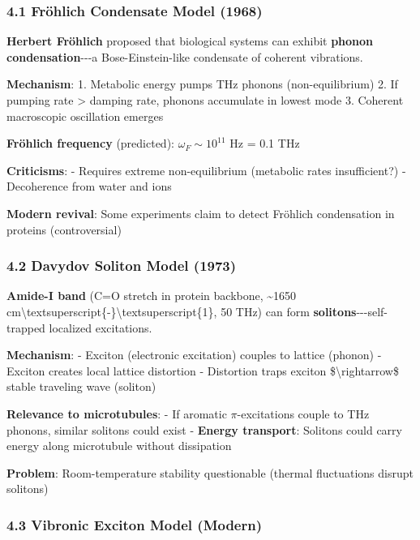 \subsubsection{4.1 Fröhlich Condensate Model
(1968)}\label{fruxf6hlich-condensate-model-1968}

\textbf{Herbert Fröhlich} proposed that biological systems can exhibit
\textbf{phonon condensation}-\/-\/-a Bose-Einstein-like condensate of
coherent vibrations.

\textbf{Mechanism}: 1. Metabolic energy pumps THz phonons
(non-equilibrium) 2. If pumping rate \textgreater{} damping rate,
phonons accumulate in lowest mode 3. Coherent macroscopic oscillation
emerges

\textbf{Fröhlich frequency} (predicted): \(\omega_F \sim 10^{11}\) Hz =
0.1 THz

\textbf{Criticisms}: - Requires extreme non-equilibrium (metabolic rates
insufficient?) - Decoherence from water and ions

\textbf{Modern revival}: Some experiments claim to detect Fröhlich
condensation in proteins (controversial)

\subsubsection{4.2 Davydov Soliton Model
(1973)}\label{davydov-soliton-model-1973}

\textbf{Amide-I band} (C=O stretch in protein backbone,
\textasciitilde1650
cm\textbackslash textsuperscript\{-\}\textbackslash textsuperscript\{1\},
50 THz) can form \textbf{solitons}-\/-\/-self-trapped localized
excitations.

\textbf{Mechanism}: - Exciton (electronic excitation) couples to lattice
(phonon) - Exciton creates local lattice distortion - Distortion traps
exciton \$\textbackslash rightarrow\$ stable traveling wave (soliton)

\textbf{Relevance to microtubules}: - If aromatic \(\pi\)-excitations
couple to THz phonons, similar solitons could exist - \textbf{Energy
transport}: Solitons could carry energy along microtubule without
dissipation

\textbf{Problem}: Room-temperature stability questionable (thermal
fluctuations disrupt solitons)

\subsubsection{4.3 Vibronic Exciton Model
(Modern)}\label{vibronic-exciton-model-modern}

